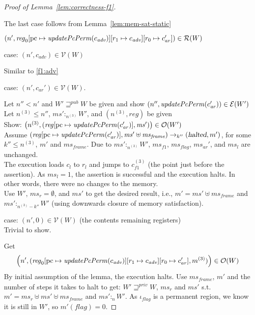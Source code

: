 \documentclass[a4paper]{article}
\newcommand{\update}[2]{[#1 \mapsto #2]}
\newcommand{\var}[1]{\mathit{#1}}
\newcommand{\hs}{\var{ms}}
\newcommand{\ms}{\hs}
\newcommand{\pcreg}{\mathrm{pc}}
\newcommand{\reg}{\var{reg}}
\newcommand{\heap}{\var{mem}}
\newcommand{\flag}{\var{flag}}
\newcommand{\halted}{\textsl{halted}}
\newcommand{\plainfun}[2]{
  \ifthenelse{\equal{#2}{}}
  {\mathit{#1}}
  {\mathit{#1}(#2)}
}
\newcommand{\updatePcPerm}[1]{\plainfun{updatePcPerm}{#1}}
\newcommand{\futurewk}{\mathbin{\sqsupseteq}^{\var{pub}}}
\newcommand{\futurestr}{\mathbin{\sqsupseteq}^{\var{priv}}}
\newcommand{\heapSat}[3][\heap]{#1 :_{#2} #3}
\newcommand{\asmType}{\plaindom{AsmType}}
\newcommand{\plaindom}[1]{\mathrm{#1}}
\newcommand{\intr}[2]{\mathcal{#1}}
\newcommand{\valueintr}[1]{\intr{V}{#1}}
\newcommand{\exprintr}[1]{\intr{E}{#1}}
\newcommand{\regintr}[1]{\intr{R}{#1}}
\newcommand{\stdvr}{\valueintr{\asmType}}
\newcommand{\stder}{\exprintr{\asmType}}
\newcommand{\stdrr}{\regintr{\asmType}}
\newcommand{\observations}{\mathcal{O}}
\newcommand{\npair}[2][n]{\left(#1,#2 \right)}
\newcommand{\step}[1][]{\rightarrow_{#1}}
\begin{document}
\begin{proof}[Proof of Lemma~\ref{lem:correctness-f1}]
\begin{enumproof}[resume]
\begin{enumproof}
\begin{enumproof}
      \item The last case follows from Lemma~\ref{lem:mem-sat-static}
      \end{enumproof}
    \end{enumproof}
  \item $\npair[n']{\reg_0\update{\pcreg}{\updatePcPerm{c_{\var{adv}}}}\update{r_1}{c_{\var{adv}}}\update{r_0}{c_{ar}'}} \in \stdrr(W)$
    \begin{enumproof}
    \item case: $\npair[n']{c_{\var{adv}}} \in \stdvr(W)$
      \begin{enumproof}
      \item Similar to \ref{f1:adv}
      \end{enumproof}
    \item case: $\npair[n']{c_{\var{ar}}'} \in \stdvr(W)$.
      \begin{enumproof}
      \item Let $n'' < n'$ and $W' \futurewk W$ be given and show $\npair[n'']{\updatePcPerm{c_{\var{ar}}'}} \in \stder(W')$\\
        Let $n^{(3)} \leq n''$, $\heapSat[\ms']{n^{(3)}}{W'}$, and $\npair[n^{(3)}]{\reg}$ be given\\
        Show: $\npair[n^{(3)}]{(\reg\update{\pcreg}{\updatePcPerm{c_{\var{ar}}'}},\ms')} \in \observations(W')$\\
        Assume $(\reg\update{\pcreg}{\updatePcPerm{c_{\var{ar}}'}},\ms' \uplus \ms_{\var{frame}}) \step[k''] (\halted, m')$, for some $k'' \leq n^{(3)}$, $m'$ and $\ms_{\var{frame}}$. Due to $\heapSat[\ms']{n^{(3)}}{W'}$, $\ms_{f1}$, $\ms_\flag$, $\ms_{\var{ar}}'$, and $\ms_l$ are unchanged. \\
        The execution loads $c_l$ to $r_l$ and jumps to $c_{f1}^{(3)}$ (the point just before the assertion). As $\ms_l = 1$, the assertion is successful and the execution halts. In other words, there were no changes to the memory.\\
        Use $W'$, $\ms_r = \emptyset$, and $\ms'$ to get the desired result, i.e., $m' = \ms' \uplus \ms_{\var{frame}}$ and $\heapSat[\ms']{n^{(3)}-k''}{W'}$ (using downwards closure of memory satisfaction).          
      \end{enumproof}
    \item case: $\npair[n']{0} \in \stdvr(W)$ (the contents remaining registers)\\
      Trivial to show.
    \end{enumproof}
  \end{enumproof}
  Get
  \[
    \npair[n']{(\reg_0\update{\pcreg}{\updatePcPerm{c_{\var{adv}}}}\update{r_1}{c_{\var{adv}}}\update{r_0}{c_{ar}'},m^{(3)})} \in \observations(W)
  \]
  By initial assumption of the lemma, the execution halts. Use $\ms_{\var{frame}}$, $m'$ and the number of steps it takes to halt to get:
  $W' \futurestr W$, $\ms_r$ and $\ms'$ s.t. $m' = \ms_r \uplus \ms' \uplus \ms_{\var{frame}}$ and $\heapSat[\ms']{n}{W'}$. As $\iota_\flag$ is a permanent region, we know it is still in $W'$, so $m'(\flag) = 0$.
\end{proof}
\end{document}
